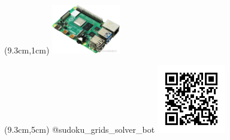 \documentclass{beamer}
\begin{document}
\begin{frame}
\begin{textblock*}{3cm}(9.3cm,1cm)
\includegraphics[width=3cm]{Rasberry}
\end{textblock*}

\begin{textblock*}{3cm}(9.3cm,5cm)
\tiny @sudoku\_grids\_solver\_bot
\includegraphics[width=3cm]{qr_frame}
\end{textblock*}

\end{frame}
\end{document}
